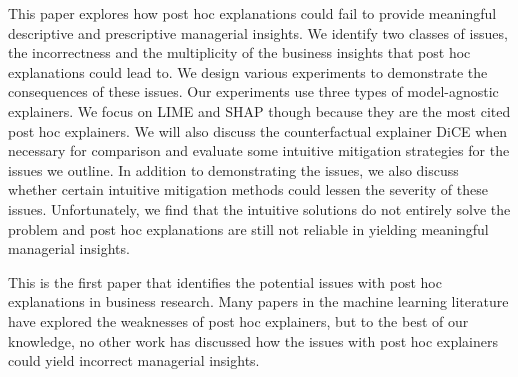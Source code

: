 \documentclass[11pt]{article}    %
\begin{document}
This paper explores how post hoc explanations could fail to provide meaningful descriptive and prescriptive managerial insights.  We identify two classes of issues, the incorrectness and the multiplicity of the business insights that post hoc explanations could lead to. We design various experiments to demonstrate the consequences of these issues.  Our experiments use three types of model-agnostic explainers. We focus on LIME and SHAP though because they are the most cited post hoc explainers. We will also discuss the counterfactual explainer DiCE when necessary for comparison and evaluate some intuitive mitigation strategies for the issues we outline. In addition to demonstrating the issues, we also  discuss whether certain intuitive mitigation methods could lessen the severity of these issues.  Unfortunately, we find that the intuitive solutions do not entirely solve the problem and post hoc explanations are still not reliable in yielding meaningful managerial insights.


This is the first paper that identifies the potential issues with post hoc explanations in business research. Many papers in the machine learning literature have explored the weaknesses of post hoc explainers, but to the best of our knowledge, no other work has discussed how the issues with post hoc explainers could yield incorrect managerial insights. 
\end{document}
